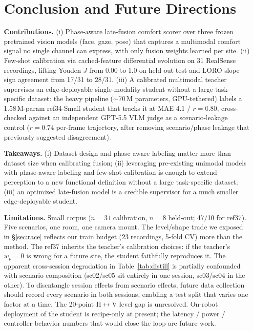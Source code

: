 \documentclass{article}
\begin{document}
\section{Conclusion and Future Directions}

\textbf{Contributions.} (i) Phase-aware late-fusion comfort scorer over three frozen pretrained vision models (face, gaze, pose) that captures a multimodal comfort signal no single channel can express, with only fusion weights learned per site. (ii) Few-shot calibration via cached-feature differential evolution on 31 RealSense recordings, lifting Youden $J$ from 0.00 to 1.0 on held-out test and LORO slope-sign agreement from 17/31 to 28/31. (iii) A calibrated multimodal teacher supervises an edge-deployable single-modality student without a large task-specific dataset: the heavy pipeline ($\sim$70\,M parameters, GPU-tethered) labels a 1.58\,M-param ref34-Small student that tracks it at MAE 4.1 / $r = 0.80$, cross-checked against an independent GPT-5.5 VLM judge as a scenario-leakage control ($r = 0.74$ per-frame trajectory, after removing scenario/phase leakage that previously suggested disagreement).

\textbf{Takeaways.} (i) Dataset design and phase-aware labeling matter more than dataset size when calibrating fusion; (ii) leveraging pre-existing unimodal models with phase-aware labeling and few-shot calibration is enough to extend perception to a new functional definition without a large task-specific dataset; (iii) an optimized late-fusion model is a credible supervisor for a much smaller edge-deployable student.

\textbf{Limitations.} Small corpus ($n=31$ calibration, $n=8$ held-out; 47/10 for ref37). Five scenarios, one room, one camera mount. The level/shape trade we exposed in \S\ref{sec:race} reflects our train budget (23 recordings, 5-fold CV) more than the method. The ref37 inherits the teacher's calibration choices: if the teacher's $w_p = 0$ is wrong for a future site, the student faithfully reproduces it. The apparent cross-session degradation in Table~\ref{tab:distill} is partially confounded with scenario composition (sc02/sc05 sit entirely in one session, sc03/sc04 in the other). To disentangle session effects from scenario effects, future data collection should record every scenario in both sessions, enabling a test split that varies one factor at a time. The 20-point H$\leftrightarrow$V level gap is unresolved. On-robot deployment of the student is recipe-only at present; the latency / power / controller-behavior numbers that would close the loop are future work.
\end{document}
